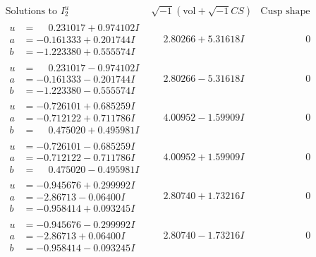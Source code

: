 \documentclass[1p]{elsarticle_modified}
\theoremstyle{definition}
\newcommand{\I}{\sqrt{-1}}
\begin{document}
$$\begin{array}{c|c|c}  
\text{Solutions to }I^u_{2}& \I (\text{vol} + \sqrt{-1}CS) & \text{Cusp shape}\\
 \hline 
\begin{aligned}
u &= \phantom{-}0.231017 + 0.974102 I \\
a &= -0.161333 + 0.201744 I \\
b &= -1.223380 + 0.555574 I\end{aligned}
 & \phantom{-}2.80266 + 5.31618 I & \phantom{-0.000000 } 0 \\ \hline\begin{aligned}
u &= \phantom{-}0.231017 - 0.974102 I \\
a &= -0.161333 - 0.201744 I \\
b &= -1.223380 - 0.555574 I\end{aligned}
 & \phantom{-}2.80266 - 5.31618 I & \phantom{-0.000000 } 0 \\ \hline\begin{aligned}
u &= -0.726101 + 0.685259 I \\
a &= -0.712122 + 0.711786 I \\
b &= \phantom{-}0.475020 + 0.495981 I\end{aligned}
 & \phantom{-}4.00952 - 1.59909 I & \phantom{-0.000000 } 0 \\ \hline\begin{aligned}
u &= -0.726101 - 0.685259 I \\
a &= -0.712122 - 0.711786 I \\
b &= \phantom{-}0.475020 - 0.495981 I\end{aligned}
 & \phantom{-}4.00952 + 1.59909 I & \phantom{-0.000000 } 0 \\ \hline\begin{aligned}
u &= -0.945676 + 0.299992 I \\
a &= -2.86713 - 0.06400 I \\
b &= -0.958414 + 0.093245 I\end{aligned}
 & \phantom{-}2.80740 + 1.73216 I & \phantom{-0.000000 } 0 \\ \hline\begin{aligned}
u &= -0.945676 - 0.299992 I \\
a &= -2.86713 + 0.06400 I \\
b &= -0.958414 - 0.093245 I\end{aligned}
 & \phantom{-}2.80740 - 1.73216 I & \phantom{-0.000000 } 0 \\ \hline\begin{aligned}

\end{aligned}
\end{array}$$
\end{document}
